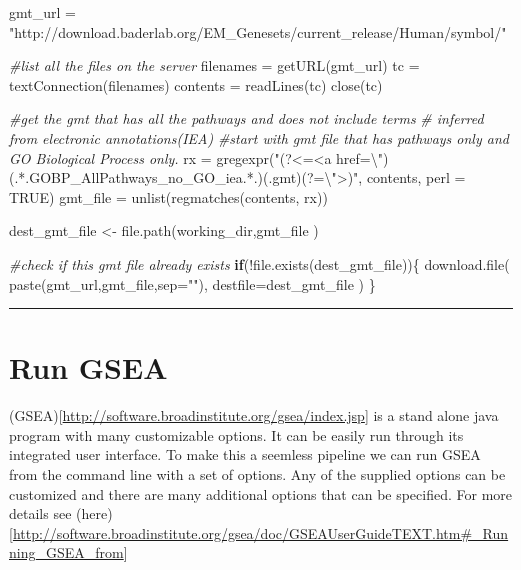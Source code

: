 \documentclass[
]{book}
\newenvironment{Shaded}{\begin{snugshade}}{\end{snugshade}}
\newcommand{\AttributeTok}[1]{\textcolor[rgb]{0.77,0.63,0.00}{#1}}
\newcommand{\CommentTok}[1]{\textcolor[rgb]{0.56,0.35,0.01}{\textit{#1}}}
\newcommand{\ConstantTok}[1]{\textcolor[rgb]{0.00,0.00,0.00}{#1}}
\newcommand{\ControlFlowTok}[1]{\textcolor[rgb]{0.13,0.29,0.53}{\textbf{#1}}}
\newcommand{\FunctionTok}[1]{\textcolor[rgb]{0.00,0.00,0.00}{#1}}
\newcommand{\NormalTok}[1]{#1}
\newcommand{\OtherTok}[1]{\textcolor[rgb]{0.56,0.35,0.01}{#1}}
\newcommand{\SpecialCharTok}[1]{\textcolor[rgb]{0.00,0.00,0.00}{#1}}
\newcommand{\StringTok}[1]{\textcolor[rgb]{0.31,0.60,0.02}{#1}}
\begin{document}
\begin{Shaded}
\begin{Highlighting}[]
\NormalTok{gmt\_url }\OtherTok{=} \StringTok{"http://download.baderlab.org/EM\_Genesets/current\_release/Human/symbol/"}

\CommentTok{\#list all the files on the server}
\NormalTok{filenames }\OtherTok{=} \FunctionTok{getURL}\NormalTok{(gmt\_url)}
\NormalTok{tc }\OtherTok{=} \FunctionTok{textConnection}\NormalTok{(filenames)}
\NormalTok{contents }\OtherTok{=} \FunctionTok{readLines}\NormalTok{(tc)}
\FunctionTok{close}\NormalTok{(tc)}

\CommentTok{\#get the gmt that has all the pathways and does not include terms }
\CommentTok{\# inferred from electronic annotations(IEA)}
\CommentTok{\#start with gmt file that has pathways only and GO Biological Process only.}
\NormalTok{rx }\OtherTok{=} \FunctionTok{gregexpr}\NormalTok{(}\StringTok{"(?\textless{}=\textless{}a href=}\SpecialCharTok{\textbackslash{}"}\StringTok{)(.*.GOBP\_AllPathways\_no\_GO\_iea.*.)(.gmt)(?=}\SpecialCharTok{\textbackslash{}"}\StringTok{\textgreater{})"}\NormalTok{,}
\NormalTok{  contents, }\AttributeTok{perl =} \ConstantTok{TRUE}\NormalTok{)}
\NormalTok{gmt\_file }\OtherTok{=} \FunctionTok{unlist}\NormalTok{(}\FunctionTok{regmatches}\NormalTok{(contents, rx))}

\NormalTok{dest\_gmt\_file }\OtherTok{\textless{}{-}} \FunctionTok{file.path}\NormalTok{(working\_dir,gmt\_file )}

\CommentTok{\#check if this gmt file already exists}
\ControlFlowTok{if}\NormalTok{(}\SpecialCharTok{!}\FunctionTok{file.exists}\NormalTok{(dest\_gmt\_file))\{}
  \FunctionTok{download.file}\NormalTok{(}
    \FunctionTok{paste}\NormalTok{(gmt\_url,gmt\_file,}\AttributeTok{sep=}\StringTok{""}\NormalTok{),}
    \AttributeTok{destfile=}\NormalTok{dest\_gmt\_file}
\NormalTok{  )}
\NormalTok{\}}
\end{Highlighting}
\end{Shaded}

\begin{center}\rule{0.5\linewidth}{0.5pt}\end{center}

\hypertarget{run-gsea}{%
\section{Run GSEA}\label{run-gsea}}

(GSEA){[}\url{http://software.broadinstitute.org/gsea/index.jsp}{]} is a stand alone java program with many customizable options. It can be easily run through its integrated user interface. To make this a seemless pipeline we can run GSEA from the command line with a set of options. Any of the supplied options can be customized and there are many additional options that can be specified. For more details see (here){[}\url{http://software.broadinstitute.org/gsea/doc/GSEAUserGuideTEXT.htm\#_Running_GSEA_from}{]}
\end{document}

